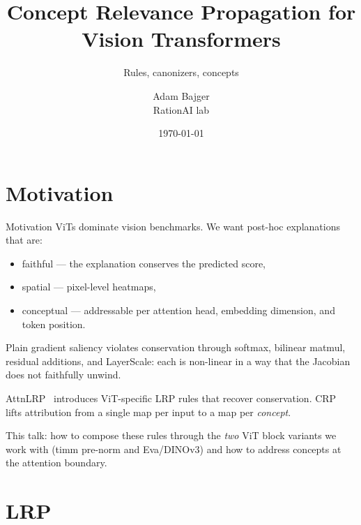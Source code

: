 \documentclass[
  aspectratio=169,
]{beamer}
\title[CRP for ViTs]{Concept Relevance Propagation for Vision Transformers}
\subtitle{Rules, canonizers, concepts}
\author[A.~Bajger]{Adam Bajger\texorpdfstring{\\}{, }RationAI lab}
\institute[FI MU]{Faculty of Informatics, Masaryk University}
\date{\today}
\begin{document}
\begin{frame}[plain]
  \maketitle
\end{frame}

\section[Motivation]{Motivation}

\begin{frame}{Motivation}
ViTs dominate vision benchmarks. We want post-hoc explanations that are:
\begin{itemize}
  \item \alert{faithful} — the explanation conserves the predicted score,
  \item \alert{spatial} — pixel-level heatmaps,
  \item \alert{conceptual} — addressable per attention head, embedding
        dimension, and token position.
\end{itemize}
Plain gradient saliency violates conservation through softmax,
bilinear matmul, residual additions, and LayerScale: each is
non-linear in a way that the Jacobian does not faithfully unwind.

\smallskip
AttnLRP~\cite{achtibat2024attnlrp} introduces ViT-specific LRP rules
that recover conservation. CRP~\cite{achtibat2023crp} lifts attribution
from a single map per input to a map per \emph{concept}.

\smallskip
This talk: how to compose these rules through the \emph{two}
ViT block variants we work with (timm pre-norm and Eva/DINOv3) and
how to address concepts at the attention boundary.
\end{frame}

\section[LRP]{LRP}
\end{document}
